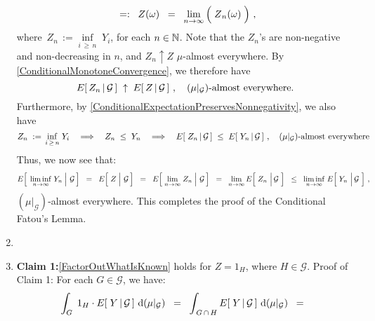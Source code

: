 \begin{enumerate}
\begin{equation*}
	\;\; =: \;\;
	Z(\omega)
	\;\; = \;\;
		\underset{n\rightarrow\infty}{\lim}\left(\;\overset{{\color{white}.}}{Z}_{n}(\omega)\;\right)\,,
	\end{equation*}
	where \,$Z_{n} \,:= \underset{i\,\geq\,n}{\inf}\;Y_{i}$, for each $n \in \mathbb{N}$.
	Note that the $Z_{n}$'s are non-negative and non-decreasing in $n$,
	and $Z_{n} \uparrow Z$ $\mu$-almost everywhere.
	By \eqref{ConditionalMonotoneConvergence}, we therefore have
	\begin{equation*}
	E\!\left[\,Z_{n}\,\vert\,\mathcal{G}\,\right] \;\uparrow\; E\!\left[\,Z\,\vert\,\mathcal{G}\,\right]\,,
	\quad
	\textnormal{$(\mu\vert_{\mathcal{G}})$-almost everywhere.}
	\end{equation*}
	Furthermore, by \eqref{ConditionalExpectationPreservesNonnegativity}, we also have
	\begin{equation*}
	Z_{n} \;:=\, \underset{i\,\geq\,n}{\inf}\;Y_{i}
	\quad\Longrightarrow\quad
		Z_{n} \;\leq\; Y_{n}
	\quad\Longrightarrow\quad
		E\!\left[\;Z_{n}\,\vert\,\mathcal{G}\,\right] \;\leq\; E\!\left[\;Y_{n}\,\vert\,\mathcal{G}\,\right]\,,
	\quad\textnormal{$(\mu\vert_{\mathcal{G}})$-almost everywhere}
	\end{equation*}
	Thus, we now see that:
	\begin{eqnarray*}
	E\!\left[\;\left.\underset{n\rightarrow\infty}{\liminf}\;Y_{n}\;\right\vert\,\mathcal{G}\,\right]
	\;\; = \;\;
		E\!\left[\,\left.\overset{{\color{white}.}}{Z}\;\right\vert\,\mathcal{G}\,\right]		
	\;\; = \;\;
		E\!\left[\,\left.\underset{n\rightarrow\infty}{\lim}\;Z_{n}\;\right\vert\,\mathcal{G}\,\right]
	\;\; = \;\;
		\underset{n\rightarrow\infty}{\lim}\,E\!\left[\;Z_{n}\,\left\vert\,\overset{{\color{white}.}}{\mathcal{G}}\right.\,\right]
	\;\; \leq \;\;
		\underset{n\rightarrow\infty}{\liminf}\;E\!\left[\;Y_{n}\,\left\vert\,\overset{{\color{white}.}}{\mathcal{G}}\right.\,\right]\,,
	\end{eqnarray*}
	$(\mu\vert_{\mathcal{G}})$-almost everywhere.
	This completes the proof of the Conditional Fatou's Lemma.
\item
\item
	\textbf{Claim 1:}\;\;\eqref{FactorOutWhatIsKnown} holds for $Z = 1_{H}$, where $H \in \mathcal{G}$.
	\vskip 0.0cm
	Proof of Claim 1: For each $G \in \mathcal{G}$, we have:
	\begin{equation*}
	\int_{G}\;1_{H} \cdot E\!\left[\;Y\,\vert\,\mathcal{G}\,\right]\,\d(\mu\vert_{\mathcal{G}})
	\;\; = \;\;
	\int_{\,G\,\cap\,H}E\!\left[\;Y\,\vert\,\mathcal{G}\,\right]\,\d(\mu\vert_{\mathcal{G}})
	\;\; = \;\;

\end{equation*}
\end{enumerate}
